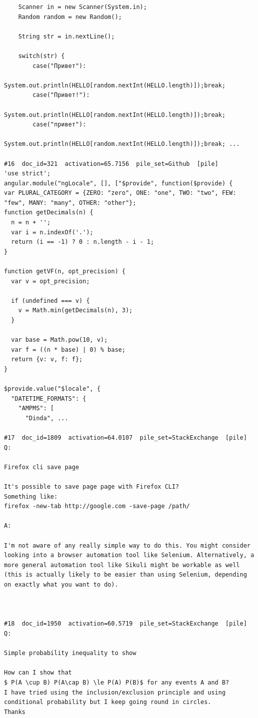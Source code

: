 \begin{verbatim}
    Scanner in = new Scanner(System.in);
    Random random = new Random();

    String str = in.nextLine();

    switch(str) {
        case("Привет"):
            System.out.println(HELLO[random.nextInt(HELLO.length)]);break;
        case("Привет!"):
            System.out.println(HELLO[random.nextInt(HELLO.length)]);break;
        case("привет"):
            System.out.println(HELLO[random.nextInt(HELLO.length)]);break; ...

#16  doc_id=321  activation=65.7156  pile_set=Github  [pile]
'use strict';
angular.module("ngLocale", [], ["$provide", function($provide) {
var PLURAL_CATEGORY = {ZERO: "zero", ONE: "one", TWO: "two", FEW: "few", MANY: "many", OTHER: "other"};
function getDecimals(n) {
  n = n + '';
  var i = n.indexOf('.');
  return (i == -1) ? 0 : n.length - i - 1;
}

function getVF(n, opt_precision) {
  var v = opt_precision;

  if (undefined === v) {
    v = Math.min(getDecimals(n), 3);
  }

  var base = Math.pow(10, v);
  var f = ((n * base) | 0) % base;
  return {v: v, f: f};
}

$provide.value("$locale", {
  "DATETIME_FORMATS": {
    "AMPMS": [
      "Dinda", ...

#17  doc_id=1809  activation=64.0107  pile_set=StackExchange  [pile]
Q:

Firefox cli save page

It's possible to save page page with Firefox CLI?
Something like: 
firefox -new-tab http://google.com -save-page /path/

A:

I'm not aware of any really simple way to do this. You might consider looking into a browser automation tool like Selenium. Alternatively, a more general automation tool like Sikuli might be workable as well (this is actually likely to be easier than using Selenium, depending on exactly what you want to do).



#18  doc_id=1950  activation=60.5719  pile_set=StackExchange  [pile]
Q:

Simple probability inequality to show

How can I show that 
$ P(A \cup B) P(A\cap B) \le P(A) P(B)$ for any events A and B?
I have tried using the inclusion/exclusion principle and using conditional probability but I keep going round in circles.
Thanks


\end{verbatim}

